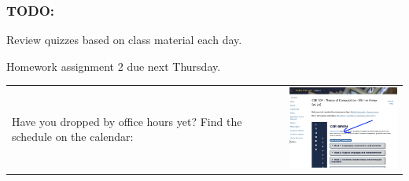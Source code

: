\subsubsection*{TODO:}
\begin{list}
   {\itemsep2pt}
   \item Review quizzes based on class material each day. 
   \item Homework assignment 2 due next Thursday.
   \item \begin{tabular}{p{4in}c}
    Have you dropped by office hours yet? Find the schedule on the calendar: &   
   \includegraphics[width=2in]{../../resources/images/officehourslink.png}
   \end{tabular}
\end{list}

